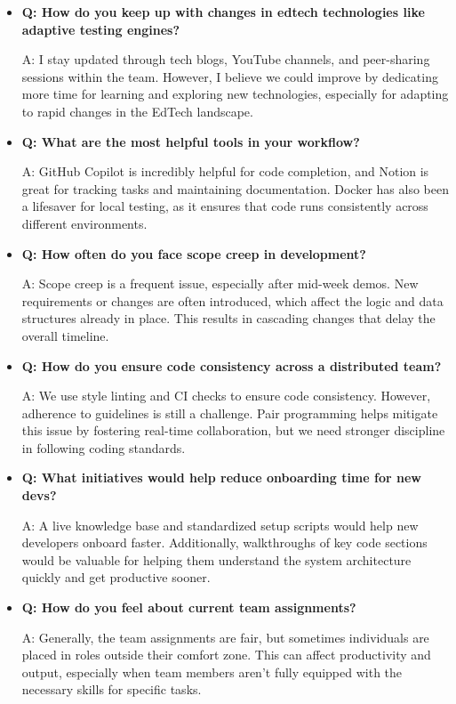 \documentclass[12pt,a4paper,oneside]{book}
\begin{document}
\begin{itemize}
\item \textbf{Q: How do you keep up with changes in edtech technologies like adaptive testing engines?} 

A: I stay updated through tech blogs, YouTube channels, and peer-sharing sessions within the team. However, I believe we could improve by dedicating more time for learning and exploring new technologies, especially for adapting to rapid changes in the EdTech landscape.

\item \textbf{Q: What are the most helpful tools in your workflow?} 

A: GitHub Copilot is incredibly helpful for code completion, and Notion is great for tracking tasks and maintaining documentation. Docker has also been a lifesaver for local testing, as it ensures that code runs consistently across different environments.

\item \textbf{Q: How often do you face scope creep in development?} 

A: Scope creep is a frequent issue, especially after mid-week demos. New requirements or changes are often introduced, which affect the logic and data structures already in place. This results in cascading changes that delay the overall timeline.

\item \textbf{Q: How do you ensure code consistency across a distributed team?} 

A: We use style linting and CI checks to ensure code consistency. However, adherence to guidelines is still a challenge. Pair programming helps mitigate this issue by fostering real-time collaboration, but we need stronger discipline in following coding standards.

\item \textbf{Q: What initiatives would help reduce onboarding time for new devs?}

A: A live knowledge base and standardized setup scripts would help new developers onboard faster. Additionally, walkthroughs of key code sections would be valuable for helping them understand the system architecture quickly and get productive sooner.

\item \textbf{Q: How do you feel about current team assignments?} 

A: Generally, the team assignments are fair, but sometimes individuals are placed in roles outside their comfort zone. This can affect productivity and output, especially when team members aren’t fully equipped with the necessary skills for specific tasks.


\end{itemize}
\end{document}
